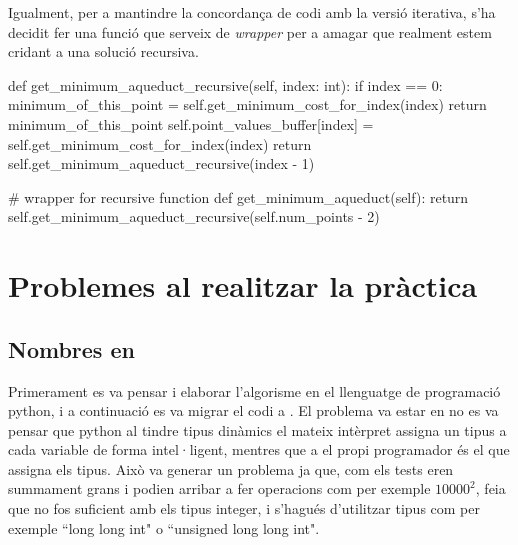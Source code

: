 \documentclass[12pt, letterpaper]{article}
\begin{document}
Igualment, per a mantindre la concordança de codi amb la versió iterativa, s'ha decidit fer una funció que serveix de \textit{wrapper} per a amagar que realment estem cridant a una solució recursiva.
\label{pseudocodirecursiu}
\begin{python}
def get_minimum_aqueduct_recursive(self, index: int):
    if index == 0:
        minimum_of_this_point = self.get_minimum_cost_for_index(index)
        return minimum_of_this_point
    self.point_values_buffer[index] = self.get_minimum_cost_for_index(index)
    return self.get_minimum_aqueduct_recursive(index - 1)

# wrapper for recursive function
def get_minimum_aqueduct(self):
    return self.get_minimum_aqueduct_recursive(self.num_points - 2)
\end{python}

\section{Problemes al realitzar la pràctica}
\subsection{Nombres en \cpluspluslogo}
Primerament es va pensar i elaborar l'algorisme en el llenguatge de programació python, i a continuació es va migrar el codi a \cpluspluslogo. El problema va estar en no es va pensar que python al tindre tipus dinàmics el mateix intèrpret assigna un tipus a cada variable de forma intel·ligent, mentres que a \cpluspluslogo el propi programador és el que assigna els tipus. Això va generar un problema ja que, com els tests eren summament grans i podien arribar a fer operacions com per exemple $10000^{2}$, feia que no fos suficient amb els tipus integer, i s'hagués d'utilitzar tipus com per exemple ``long long int" o ``unsigned long long int".
\end{document}
